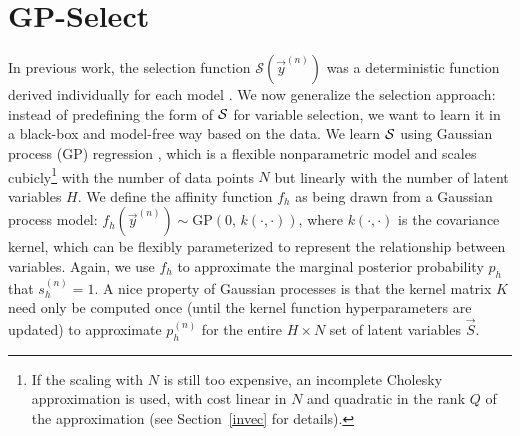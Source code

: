 \section{GP-Select}
\label{gp-select}
%
In previous work, the selection function $\mathcal{S}(\vec{y}^{(n)})$ 
was a deterministic function derived  individually for each model 
\citep[see e.g.][]{SheltonEtAl2011, SheltonEtAl2012, DaiLucke2012a, DaiLucke2012b,
BornscheinEtAl2013, SheikhEtAl2014, SheltonEtAl2015}.
%
We now generalize the selection approach:  %
instead of predefining the form of $\mathcal{S}$ for variable selection, we want
to learn it in a black-box and model-free way based on the data.
%
We learn $\mathcal{S}$  using Gaussian process (GP) regression
\citep[e.g.][]{RasmussenGPbook}, which is a flexible nonparametric model 
and scales cubicly\footnote{If the scaling with $N$ is still too expensive, an incomplete Cholesky approximation is used, with cost linear in $N$ and quadratic in the rank $Q$ of the approximation (see Section~\ref{invec} for details).} with the number of data points $N$ but linearly with the number of latent variables $H$.  
%
%
%
%
We define the affinity function $f_h$ as being drawn from a Gaussian process model: 
$f_h(\vec{y}^{(n)}) \sim \text{GP}\left(0, \, k(\cdot,\cdot) \right)$, where $k(\cdot, \cdot)$ is the covariance kernel, 
which can be flexibly parameterized to represent the relationship between variables.
Again, we use $f_h$ to approximate the marginal posterior probability $p_h$ that $s_h^{(n)}=1$.
%
A nice property of Gaussian processes is that the kernel matrix $K$ need only be computed once (until the kernel function hyperparameters are updated) 
to approximate $p_h^{(n)}$ for the entire $H\times N$ set of latent variables $\vec{S}$.

